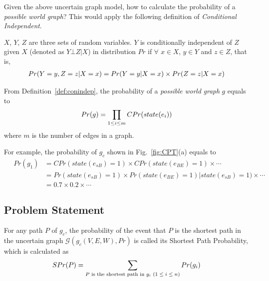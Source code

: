 \documentclass[runningheads,a4paper]{llncs}
\begin{document}
Given the above uncertain graph model, how to calculate the probability of a \emph{possible world graph}? This would apply the following definition of \emph{Conditional Independent}.

\begin{definition}
  \label{def:conindep}
  $X$, $Y$, $Z$ are three sets of random variables. $Y$ is conditionally independent of $Z$ given $X$ (denoted as $Y\bot Z|X$) in distribution $Pr$ if $\forall$ $x\in X$, $y\in Y$ and $z\in Z$, that is,
  \vspace{-0.2cm}
  \begin{eqnarray*}
   Pr(Y=y,Z=z|X=x) =Pr(Y=y|X=x)\times Pr(Z=z|X=x)
   \vspace{-0.2cm}
  \end{eqnarray*}
\end{definition}

From Definition~\ref{def:conindep}, the probability of a \emph{possible world graph} $g$ equals to
\vspace{-0.2cm}
\begin{equation}
\label{eq:pos-gra-pro}
Pr(g)=\prod_{1\leq i\leq m} CPr(state(e_i))
\vspace{-0.2cm}
\end{equation}
where $m$ is the number of edges in a graph.

For example, the probability of $g_c$ shown in Fig.~\ref{fig:CPT}(a) equals to
\vspace{-0.2cm}
{\setlength\arraycolsep{1pt}
\small
\begin{eqnarray}
\label{eq:egSPr}
\ & Pr(g_1) & = CPr(state(e_{sB})=1) \times CPr(state(e_{BE})=1) \times \cdots{}
\nonumber \\
&&{} =Pr(state(e_{sB})=1) \times Pr(state(e_{BE})=1) | state(e_{sB})=1) \times \cdots {}
\nonumber \\
&&{} = 0.7 \times 0.2 \times \cdots
\end{eqnarray}}

\vspace{-0.9cm}
\subsection{Problem Statement}
\label{sec:sec:pro-state}
\vspace{-0.2cm}

\begin{definition}
\label{def:SPr}
For any path $P$ of $g_c$, the probability of the event that $P$ is the shortest path in the uncertain graph $\mathcal{G}(g_c(V,E,W),Pr)$ is called its Shortest Path Probability, which is calculated as
\vspace{-0.2cm}
\begin{equation}
\label{eq:SPr}
SPr(P)=\sum_{\textrm{$P$ is the shortest path in $g_i$ ($1\leq i\leq n$)}} Pr(g_i)
\vspace{-0.2cm}
\end{equation}
\end{definition}
\end{document}
